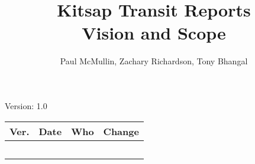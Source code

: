 \documentclass[letterpaper,12pt]{article}
\title{Kitsap Transit Reports\\Vision and Scope}
\author{Paul McMullin, Zachary Richardson, Tony Bhangal}
\begin{document}
\maketitle

\begin{center}
  Version: 1.0
\end{center}

\vfill
\begin{tabularx}{\linewidth}{|l|l|l|X|}\hline
Ver. & Date & Who & Change \\\hline
     &      &     &             \\\hline
     &      &     &             \\\hline
     &      &     &             \\\hline
     &      &     &             \\\hline
     &      &     &             \\\hline
\end{tabularx}
\newpage





\end{document}
